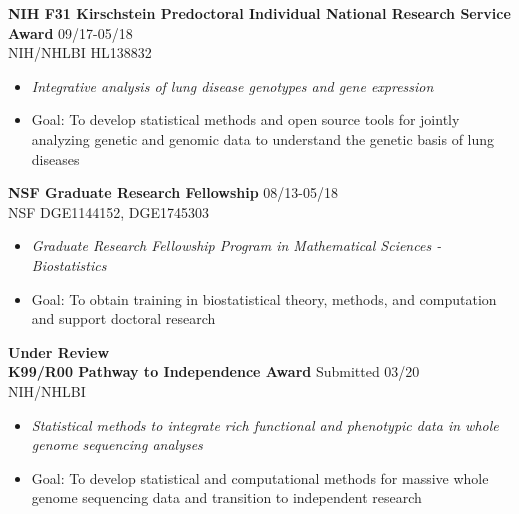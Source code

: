 \documentclass[10pt]{article}
\begin{document}
\textbf{NIH F31 Kirschstein Predoctoral Individual National Research Service Award} \hfill 09/17-05/18\\
\indent NIH/NHLBI HL138832
\begin{itemize}
	\item \textit{Integrative analysis of lung disease genotypes and gene expression}
	\item Goal: To develop statistical methods and open source tools for jointly analyzing genetic and genomic data to understand the genetic basis of lung diseases\\
\end{itemize}

\textbf{NSF Graduate Research Fellowship} \hfill 08/13-05/18\\
\indent NSF DGE1144152, DGE1745303
\begin{itemize}
	\item \textit{Graduate Research Fellowship Program in Mathematical Sciences - Biostatistics}
	\item Goal: To obtain training in biostatistical theory, methods, and computation and support doctoral research\\
\end{itemize}


\indent \textbf{Under Review}  \\

\textbf{K99/R00 Pathway to Independence Award} \hfill Submitted 03/20\\
\indent NIH/NHLBI
\begin{itemize}
	\item \textit{Statistical methods to integrate rich functional and phenotypic data in whole genome sequencing analyses}
	\item Goal: To develop statistical and computational methods for massive whole genome sequencing data and transition to independent research \\
\end{itemize}

\vspace{0.25cm}
\end{document}

